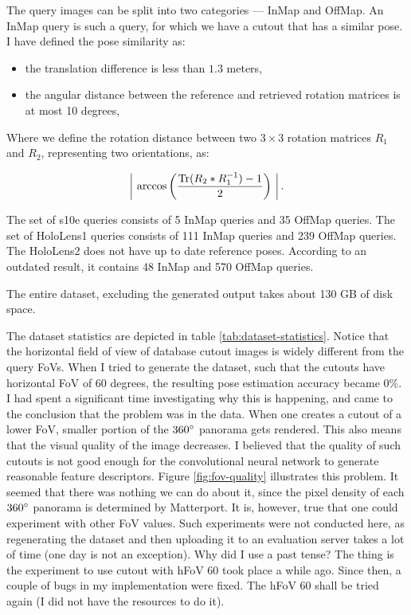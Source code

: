 \documentclass[twoside]{ctuthesis}
\theoremstyle{plain}
\theoremstyle{definition}
\theoremstyle{note}
\begin{document}
The query images can be split into two categories --- InMap and OffMap. An InMap query is such a query, for which we have a cutout that has a similar pose. I have defined the pose similarity as:

\begin{itemize}
	\item the translation difference is less than $1.3$ meters,
	\item the angular distance between the reference and retrieved rotation matrices is at most 10 degrees,
\end{itemize}

Where we define the rotation distance between two $3 \times 3$ rotation matrices $R_1$ and $R_2$, representing two orientations, as:

\begin{equation}
	\label{eq:rotation-distance}
	\left |~\arccos \left(\frac{\operatorname{Tr} (R_2 * R_1^{-1})-1}{2} \right)~\right|.
\end{equation}

The set of s10e queries consists of 5 InMap queries and 35 OffMap queries. The set of HoloLens1 queries consists of 111 InMap queries and 239 OffMap queries. The HoloLens2 does not have up to date reference poses. According to an outdated result, it contains 48 InMap and 570 OffMap queries.

The entire dataset, excluding the generated output takes about 130 GB of disk space.

The dataset statistics are depicted in table \ref{tab:dataset-statistics}. Notice that the horizontal field of view of database cutout images is widely different from the query FoVs. When I tried to generate the dataset, such that the cutouts have horizontal FoV of 60 degrees, the resulting pose estimation accuracy became 0\%. I had spent a significant time investigating why this is happening, and came to the conclusion that the problem was in the data. When one creates a cutout of a lower FoV, smaller portion of the $360\degree$ panorama gets rendered. This also means that the visual quality of the image decreases. I believed that the quality of such cutouts is not good enough for the convolutional neural network to generate reasonable feature descriptors. Figure \ref{fig:fov-quality} illustrates this problem. It seemed that there was nothing we can do about it, since the pixel density of each $360\degree$ panorama is determined by Matterport. It is, however, true that one could experiment with other FoV values. Such experiments were not conducted here, as regenerating the dataset and then uploading it to an evaluation server takes a lot of time (one day is not an exception). Why did I use a past tense? The thing is the experiment to use cutout with hFoV 60 took place a while ago. Since then, a couple of bugs in my implementation were fixed. The hFoV 60 shall be tried again (I did not have the resources to do it).
\end{document}
